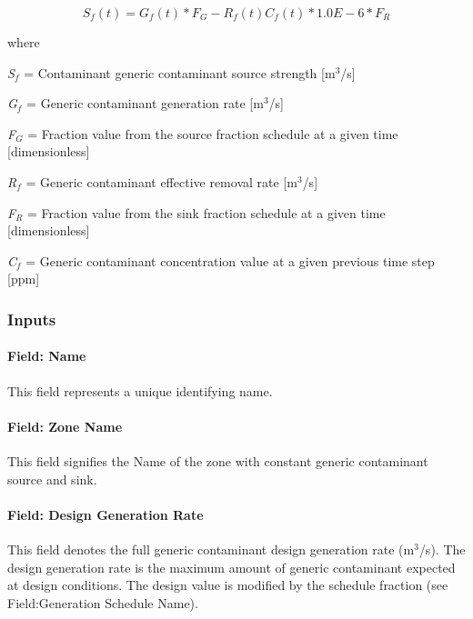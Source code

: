\begin{equation}
{S_f}(t) = {G_f}(t)*{F_G} - {R_f}(t){C_f}(t)*1.0E - 6*{F_R}
\end{equation}

where

\emph{S\(_{f}\)} = Contaminant generic contaminant source strength {[}m\(^{3}\)/s{]}

\emph{G\(_{f}\)} = Generic contaminant generation rate {[}m\(^{3}\)/s{]}

\emph{F\(_{G}\)} = Fraction value from the source fraction schedule at a given time {[}dimensionless{]}

\emph{R\(_{f}\)} = Generic contaminant effective removal rate {[}m\(^{3}\)/s{]}

\emph{F\(_{R}\)} = Fraction value from the sink fraction schedule at a given time {[}dimensionless{]}

\emph{C\(_{f}\)} = Generic contaminant concentration value at a given previous time step {[}ppm{]}

\subsubsection{Inputs}\label{inputs-11-007}

\paragraph{Field: Name}\label{field-name-11-006}

This field represents a unique identifying name.

\paragraph{Field: Zone Name}\label{field-zone-name-3-002}

This field signifies the Name of the zone with constant generic contaminant source and sink.

\paragraph{Field: Design Generation Rate}\label{field-design-generation-rate-1}

This field denotes the full generic contaminant design generation rate (m\(^{3}\)/s). The design generation rate is the maximum amount of generic contaminant expected at design conditions. The design value is modified by the schedule fraction (see Field:Generation Schedule Name).

